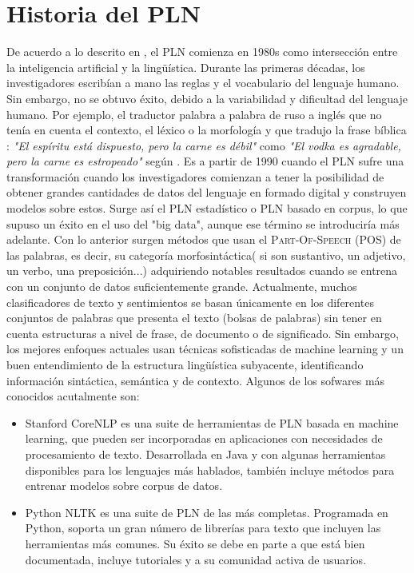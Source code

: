 \section{Historia del PLN}
De acuerdo a lo descrito en \citet{hirschberg2015advances}, el PLN comienza en 1980s como intersección entre la inteligencia artificial y la lingüística.  
Durante las primeras décadas, los investigadores escribían a mano las reglas y el vocabulario del lenguaje humano. Sin embargo, no se obtuvo éxito, debido a la variabilidad y dificultad del lenguaje humano. Por ejemplo, el traductor palabra a palabra de ruso a inglés que no tenía en cuenta el contexto, el léxico o la morfología y que tradujo la frase bíblica : \textsl{"El espíritu está dispuesto, pero la carne es débil"} como \textsl{"El vodka es agradable, pero la carne es
estropeado"} según \citet{nadkarni2011natural}. \newline
Es a partir de 1990 cuando el PLN sufre una transformación cuando los investigadores comienzan a tener la posibilidad de obtener grandes cantidades de datos del lenguaje en formado digital y construyen modelos sobre estos. Surge así el PLN estadístico o PLN basado en corpus, lo que supuso un éxito en el uso del "big data", aunque ese término se introduciría más adelante. Con lo anterior surgen métodos que usan el \textsc{Part-Of-Speech} (POS) de las palabras, es decir, su categoría morfosintáctica( si son sustantivo, un adjetivo, un verbo, una preposición...) adquiriendo notables resultados cuando se entrena con un conjunto de datos suficientemente grande. \newline
Actualmente, muchos clasificadores de texto y sentimientos se basan únicamente en los diferentes conjuntos de palabras que presenta el texto (bolsas de palabras) sin tener en cuenta estructuras a nivel de frase, de documento o de significado. Sin embargo, los mejores enfoques actuales usan técnicas sofisticadas de machine learning y un buen entendimiento de la estructura lingüística subyacente, identificando información sintáctica, semántica y de contexto. Algunos de los sofwares más conocidos acutalmente son:\newline
\begin{itemize}
\item Stanford CoreNLP \citet{manning2014stanford} es una suite de herramientas de PLN basada en machine learning, que pueden ser incorporadas en aplicaciones con necesidades de procesamiento de texto. Desarrollada en Java y con algunas herramientas disponibles para los lenguajes más hablados, también incluye métodos para entrenar modelos sobre corpus de datos.
\item Python NLTK \citet{bird2006nltk} es una suite de PLN de las más completas. Programada en Python, soporta un gran número de librerías para texto que incluyen las herramientas más comunes. Su éxito se debe en parte a que está bien documentada, incluye tutoriales y a su comunidad activa de usuarios. 
\end{itemize}
